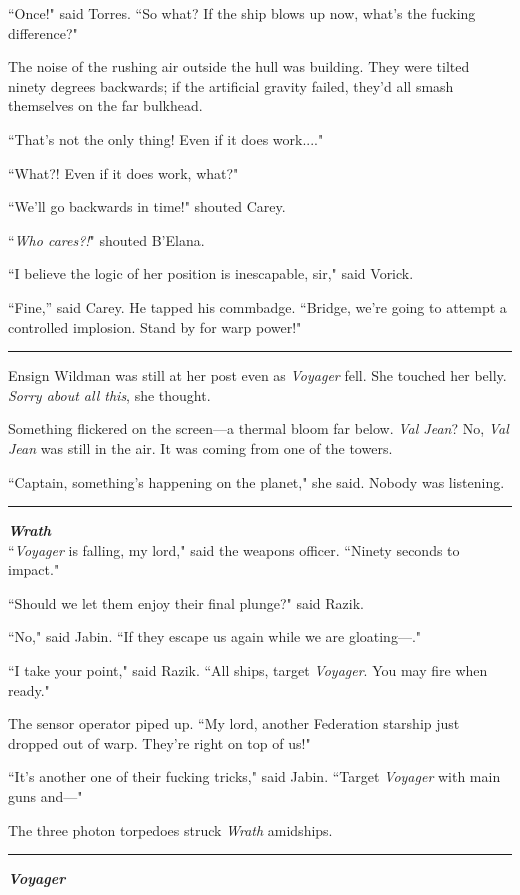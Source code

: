 \documentclass[twoside,letterpaper,12pt]{memoir}
\begin{document}
``Once!" said Torres. ``So what? If the ship blows up now, what's the fucking difference?"

The noise of the rushing air outside the hull was building. They were tilted ninety degrees backwards; if the artificial gravity failed, they'd all smash themselves on the far bulkhead.

``That's not the only thing! Even if it does work...."

``What?! Even if it does work, what?"

``We'll go backwards in time!" shouted Carey.

``\textit{Who cares?!}" shouted B'Elana.

``I believe the logic of her position is inescapable, sir," said Vorick.

``Fine,” said Carey. He tapped his commbadge. ``Bridge, we're going to attempt a controlled implosion. Stand by for warp power!"

\fancybreak{\rule{3cm}{0.4 pt}}
Ensign Wildman was still at her post even as \textit{Voyager} fell. She touched her belly. \textit{Sorry about all this}, she thought.

Something flickered on the screen---a thermal bloom far below. \textit{Val Jean}? No, \textit{Val Jean} was still in the air. It was coming from one of the towers.

``Captain, something's happening on the planet," she said. Nobody was listening.

\fancybreak{\rule{3cm}{0.4 pt}}
\noindent\textit{\textbf{Wrath}}\\

``\textit{Voyager} is falling, my lord," said the weapons officer. ``Ninety seconds to impact."

``Should we let them enjoy their final plunge?" said Razik.

``No," said Jabin. ``If they escape us again while we are gloating---."

``I take your point," said Razik. ``All ships, target \textit{Voyager}. You may fire when ready."

The sensor operator piped up. ``My lord, another Federation starship just dropped out of warp. They're right on top of us!"

``It's another one of their fucking tricks," said Jabin. ``Target \textit{Voyager} with main guns and---"

The three photon torpedoes struck \textit{Wrath} amidships.

\fancybreak{\rule{3cm}{0.4 pt}}
\noindent\textit{\textbf{Voyager}}\\
\end{document}
